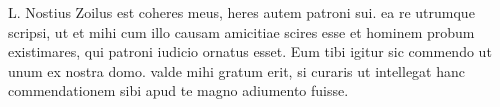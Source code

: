 


L. Nostius Zoilus est coheres meus, heres autem patroni sui. ea re utrumque scripsi, ut et mihi cum illo causam amicitiae scires esse et hominem probum existimares, qui patroni iudicio ornatus esset.  Eum tibi igitur sic commendo ut unum ex nostra domo. valde mihi gratum erit, si curaris ut intellegat hanc commendationem sibi apud te magno adiumento fuisse.
